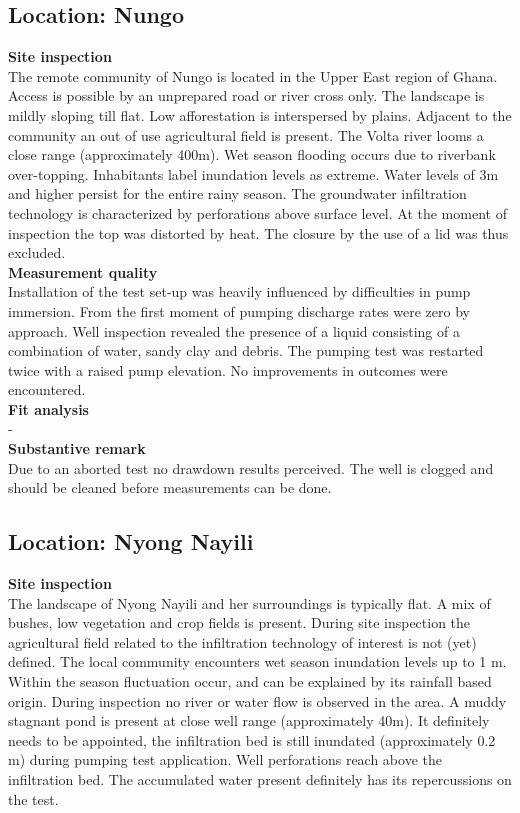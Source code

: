 \subsection{Location: Nungo}

\textbf{Site inspection} \\
The remote community of Nungo is located in the Upper East region of Ghana. Access is possible by an unprepared road or river cross only. The landscape is mildly sloping till flat. Low afforestation is interspersed by plains. Adjacent to the community an out of use agricultural field is present. The Volta river looms a close range (approximately 400m). Wet season flooding occurs due to riverbank over-topping. Inhabitants label inundation levels as extreme. Water levels of 3m and higher persist for the entire rainy season. The groundwater infiltration technology is characterized by perforations above surface level. At the moment of inspection the top was distorted by heat. The closure by the use of a lid was thus excluded. \\
   
\textbf{Measurement quality} \\
Installation of the test set-up was heavily influenced by difficulties in pump immersion. From the first moment of pumping discharge rates were zero by approach. Well inspection revealed the presence of a liquid consisting of a combination of water, sandy clay and debris. The pumping test was restarted twice with a raised pump elevation. No improvements in outcomes were encountered. \\
  
\textbf{Fit analysis} \\
- \\

\textbf{Substantive remark} \\
Due to an aborted test no drawdown results perceived. The well is clogged and should be cleaned before measurements can be done.

\subsection{Location: Nyong Nayili}

\textbf{Site inspection} \\
The landscape of Nyong Nayili and her surroundings is typically flat. A mix of bushes, low vegetation and crop fields is present. During site inspection the agricultural field related to the infiltration technology of interest is not (yet) defined. The local community encounters wet season inundation levels up to 1 m. Within the season fluctuation occur, and can be explained by its rainfall based origin. During inspection no river or water flow is observed in the area. A muddy stagnant pond is present at close well range (approximately 40m). It definitely needs to be appointed, the infiltration bed is still inundated (approximately 0.2 m) during pumping test application. Well perforations reach above the infiltration bed. The accumulated water present definitely has its repercussions on the test. \\

